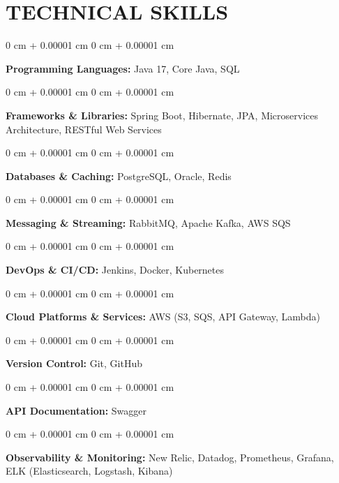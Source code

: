 \documentclass[10pt, letterpaper]{article}
\newenvironment{onecolentry}{
    \begin{adjustwidth}{
        0 cm + 0.00001 cm
    }{
        0 cm + 0.00001 cm
    }
}{
    \end{adjustwidth}
} %
\begin{document}

    \vspace{0.1 cm}
    \section{TECHNICAL SKILLS}
    \vspace{0.1 cm}

        \begin{onecolentry}
            \textbf{\textbf{Programming Languages:} } Java 17, Core Java, SQL \end{onecolentry}
        \vspace{0.1 cm}
        \begin{onecolentry}
            \textbf{Frameworks \& Libraries:} Spring Boot, Hibernate, JPA, Microservices Architecture, RESTful Web Services \end{onecolentry}
        \vspace{0.1 cm}
        \begin{onecolentry}
            \textbf{\textbf{Databases \& Caching:} } PostgreSQL, Oracle, Redis \end{onecolentry}
        \vspace{0.1 cm}
        \begin{onecolentry}
        \textbf{Messaging \& Streaming:} RabbitMQ, Apache Kafka, AWS SQS \end{onecolentry}
        \vspace{0.1 cm}
        \begin{onecolentry}
        \textbf{DevOps \& CI/CD:} Jenkins, Docker, Kubernetes  \end{onecolentry}
        \vspace{0.1 cm}
        \begin{onecolentry}
         \textbf{Cloud Platforms \& Services:}  AWS (S3, SQS, API Gateway, Lambda)
        \end{onecolentry}
        \vspace{0.1 cm}
        \begin{onecolentry}
         \textbf{Version Control:}  Git, GitHub
        \end{onecolentry}
        \vspace{0.1 cm}
        \begin{onecolentry}
        \textbf{API Documentation:}  Swagger
        \end{onecolentry}
        \vspace{0.1 cm}
        \begin{onecolentry}
        \textbf{Observability \& Monitoring:}  New Relic, Datadog, Prometheus, Grafana, ELK (Elasticsearch, Logstash, Kibana)
        \end{onecolentry}
\end{document}
